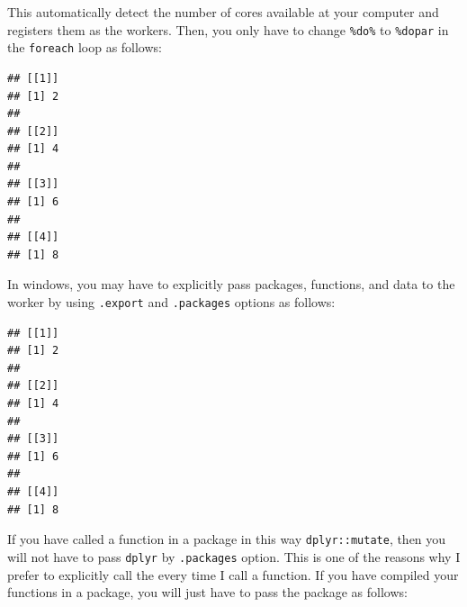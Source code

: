 \documentclass[]{book}
\newenvironment{Shaded}{\begin{snugshade}}{\end{snugshade}}
\newcommand{\KeywordTok}[1]{\textcolor[rgb]{0.13,0.29,0.53}{\textbf{#1}}}
\newcommand{\DataTypeTok}[1]{\textcolor[rgb]{0.13,0.29,0.53}{#1}}
\newcommand{\DecValTok}[1]{\textcolor[rgb]{0.00,0.00,0.81}{#1}}
\newcommand{\StringTok}[1]{\textcolor[rgb]{0.31,0.60,0.02}{#1}}
\newcommand{\CommentTok}[1]{\textcolor[rgb]{0.56,0.35,0.01}{\textit{#1}}}
\newcommand{\ControlFlowTok}[1]{\textcolor[rgb]{0.13,0.29,0.53}{\textbf{#1}}}
\newcommand{\OperatorTok}[1]{\textcolor[rgb]{0.81,0.36,0.00}{\textbf{#1}}}
\newcommand{\NormalTok}[1]{#1}
\begin{document}
This automatically detect the number of cores available at your computer
and registers them as the workers. Then, you only have to change
\texttt{\%do\%} to \texttt{\%dopar} in the \texttt{foreach} loop as
follows:

\begin{Shaded}
\end{Shaded}

\begin{verbatim}
## [[1]]
## [1] 2
## 
## [[2]]
## [1] 4
## 
## [[3]]
## [1] 6
## 
## [[4]]
## [1] 8
\end{verbatim}

In windows, you may have to explicitly pass packages, functions, and
data to the worker by using \texttt{.export} and \texttt{.packages}
options as follows:

\begin{Shaded}
\end{Shaded}

\begin{verbatim}
## [[1]]
## [1] 2
## 
## [[2]]
## [1] 4
## 
## [[3]]
## [1] 6
## 
## [[4]]
## [1] 8
\end{verbatim}

If you have called a function in a package in this way
\texttt{dplyr::mutate}, then you will not have to pass \texttt{dplyr} by
\texttt{.packages} option. This is one of the reasons why I prefer to
explicitly call the every time I call a function. If you have compiled
your functions in a package, you will just have to pass the package as
follows:
\end{document}
